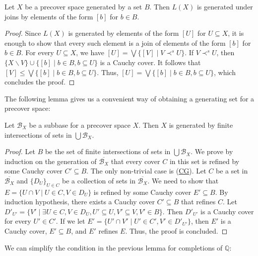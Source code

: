\documentclass[reqno]{amsart}
\newcommand{\axref}[1]{(\hyperref[ax:#1]{#1})}
\theoremstyle{definition}
\theoremstyle{remark}
\numberwithin{figure}{section}
\newcommand{\rb}{\prec}
\begin{document}
\begin{lem}
Let $X$ be a precover space generated by a set $B$.
Then $L(X)$ is generated under joins by elements of the form $[b]$ for $b \in B$.
\end{lem}
\begin{proof}
Since $L(X)$ is generated by elements of the form $[U]$ for $U \subseteq X$, it is enough to show that every such element is a join of elements of the form $[b]$ for $b \in B$.
For every $U \subseteq X$, we have $[U] = \bigvee \{ [V] \mid V \rb^s U \}$.
If $V \rb^s U$, then $\{ X \backslash V \} \cup \{ [b] \mid b \in B, b \subseteq U \}$ is a Cauchy cover.
It follows that $[V] \leq \bigvee \{ [b] \mid b \in B, b \subseteq U \}$.
Thus, $[U] = \bigvee \{ [b] \mid b \in B, b \subseteq U \}$, which concludes the proof.
\end{proof}

The following lemma gives us a convenient way of obtaining a generating set for a precover space:

\begin{lem}
Let $\mathcal{B}_X$ be a subbase for a precover space $X$.
Then $X$ is generated by finite intersections of sets in $\bigcup \mathcal{B}_X$.
\end{lem}
\begin{proof}
Let $B$ be the set of finite intersections of sets in $\bigcup \mathcal{B}_X$.
We prove by induction on the generation of $\overline{\mathcal{B}_X}$ that every cover $C$ in this set is refined by some Cauchy cover $C' \subseteq B$.
The only non-trivial case is \axref{CG}.
Let $C$ be a set in $\overline{\mathcal{B}_X}$ and $\{ D_U \}_{U \in C}$ be a collection of sets in $\overline{\mathcal{B}_X}$.
We need to show that $E = \{ U \cap V \mid U \in C, V \in D_U \}$ is refined by some Cauchy cover $E' \subseteq B$.
By induction hypothesis, there exists a Cauchy cover $C' \subseteq B$ that refines $C$.
Let $D'_{U'} = \{ V' \mid \exists U \in C, V \in D_U, U' \subseteq U, V' \subseteq V, V' \in B \}$.
Then $D'_{U'}$ is a Cauchy cover for every $U' \in C'$.
If we let $E' = \{ U' \cap V' \mid U' \in C', V' \in D'_{U'} \}$, then $E'$ is a Cauchy cover, $E' \subseteq B$, and $E'$ refines $E$.
Thus, the proof is concluded.
\end{proof}

We can simplify the condition in the previous lemma for completions of $\mathbb{Q}$:
\end{document}
